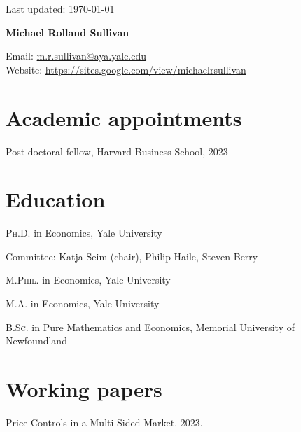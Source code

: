 \documentclass[11pt]{article} %
\begin{document}
 \begin{flushright}
   \scriptsize
	Last updated: \today
   \normalsize
\end{flushright}
{\LARGE\bfseries Michael Rolland Sullivan} %
\bigskip\bigskip\medskip %

\medskip %

Email: \href{mailto:m.r.sullivan@yale.edu}{m.r.sullivan@aya.yale.edu}\\ 
Website: \href{https://sites.google.com/view/michaelrsullivan/home}{https://sites.google.com/view/michaelrsullivan}\\ 

%

\section*{Academic appointments}

Post-doctoral fellow, Harvard Business School, 2023

\section*{Education}

\textsc{Ph.D.} in Economics, Yale University  

\hspace{1cm} \small Committee: Katja Seim (chair), Philip Haile, Steven Berry \normalsize

\textsc{M.Phil.} in Economics, Yale University 

\textsc{M.A.} in Economics, Yale University 

\textsc{B.Sc.} in Pure Mathematics and Economics, Memorial University of Newfoundland

\section*{Working papers}

Price Controls in a Multi-Sided Market. 2023. 
\end{document}
